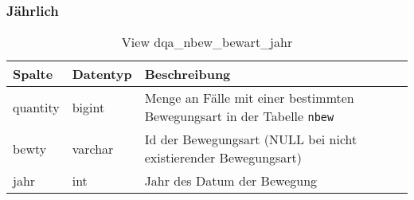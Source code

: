 \newpage

\subsubsection{Jährlich} \label{subsubsec:bewg1J}

\begin{table}[ht]
	\centering   
	\caption{View dqa\_nbew\_bewart\_jahr}
	\label{tab:bewG1J}
	\begin{tabular}{||l|l|p{10cm}||}   		
		\hline
		Spalte & Datentyp & Beschreibung \\ [0.5ex]
		\hline\hline
		quantity & bigint & Menge an Fälle mit einer bestimmten Bewegungsart in der Tabelle \texttt{nbew}\\
		\hline
		bewty & varchar & Id der Bewegungsart (NULL bei nicht existierender Bewegungsart)\\
		\hline
		jahr & int &  Jahr des Datum der Bewegung \\
		\hline		
	\end{tabular}
\end{table}
